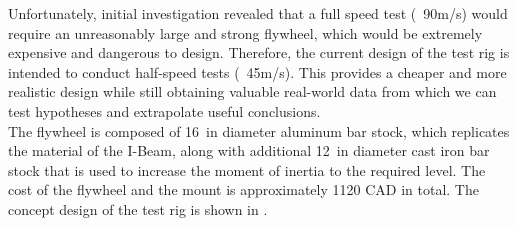\documentclass[main.tex]{subfiles}
\begin{document}
    Unfortunately, initial investigation revealed that a full speed test (~90m/s) would require an unreasonably large and strong flywheel, which would be extremely expensive and dangerous to design. Therefore, the current design of the test rig is intended to conduct half-speed tests (~45m/s). This provides a cheaper and more realistic design while still obtaining valuable real-world data from which we can test hypotheses and extrapolate useful conclusions.\\
    
    The flywheel is composed of \SI{16}{in} diameter aluminum bar stock, which replicates the material of the I-Beam, along with additional \SI{12}{in} diameter cast iron bar stock that is used to increase the moment of inertia to the required level. The cost of the flywheel and the mount is approximately 1120 CAD in total. The concept design of the test rig is shown in .\\
    
\end{document}
